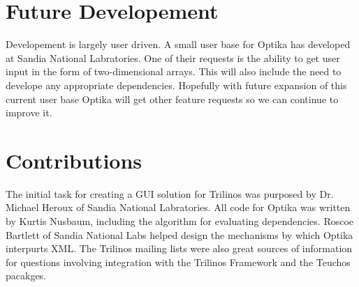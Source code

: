 \section{Future Developement}
Developement is largely user driven. A small user base for Optika has developed at Sandia National Labratories. One of their requests is the ability to get user input in the 
form of two-dimensional arrays. This will also include the need to develope any appropriate dependencies. Hopefully with future expansion of this current user base Optika will
get other feature requests so we can continue to improve it.

\section{Contributions}
The initial task for creating a GUI solution for Trilinos was purposed by Dr. Michael Heroux of Sandia National Labratories. All code for Optika was written by Kurtis Nusbaum, 
including the algorithm for evaluating dependencies. Roscoe Bartlett of Sandia National Labs helped design the mechanisms by which Optika interpurts XML. The Trilinos
mailing lists were also great sources of information for questions involving integration with the Trilinos Framework and the Teuchos pacakges.
